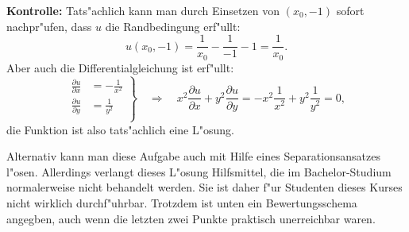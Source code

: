 \begin{loesung}
{\bf Kontrolle:}
Tats"achlich kann man durch Einsetzen von $(x_0,-1)$ sofort nachpr"ufen,
dass $u$ die Randbedingung erf"ullt:
\[
u(x_0,-1)=\frac1{x_0}-\frac1{-1}-1=\frac1{x_0}.
\]
Aber auch die Differentialgleichung ist erf"ullt:
\[
\left.
\begin{aligned}
\frac{\partial u}{\partial x}&=-\frac1{x^2}\\
\frac{\partial u}{\partial y}&=\frac1{y^2}\\
\end{aligned}
\right\}
\quad\Rightarrow\quad
x^2\frac{\partial u}{\partial x}+y^2\frac{\partial u}{\partial y}
=
-x^2\frac1{x^2}+y^2\frac1{y^2}
=
0,
\]
die Funktion ist also tats"achlich eine L"osung.

\medskip

Alternativ kann man diese Aufgabe auch mit Hilfe eines Separationsansatzes
l"osen. Allerdings verlangt dieses L"osung Hilfsmittel, die im Bachelor-Studium
normalerweise nicht behandelt werden. Sie ist daher f"ur Studenten dieses
Kurses nicht wirklich durchf"uhrbar. Trotzdem ist unten ein Bewertungsschema
angegben, auch wenn die letzten zwei Punkte praktisch unerreichbar waren.

\medskip


\end{loesung}
